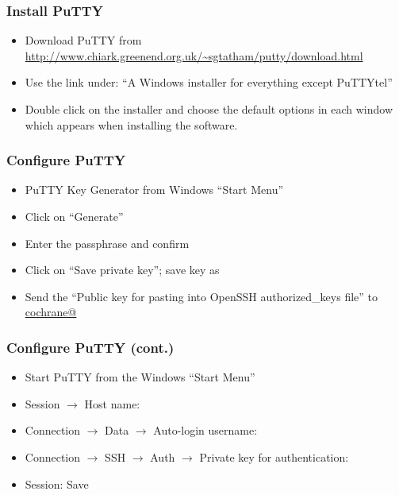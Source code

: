\begin{frame}
    \frametitle{Install PuTTY}
    \windowsframe

    \begin{itemize}
        \item Download PuTTY from
            \url{http://www.chiark.greenend.org.uk/~sgtatham/putty/download.html}
        \item Use the link under:
            \enquote{A Windows installer for everything except PuTTYtel}
        \item Double click on the installer and choose the default options
            in each window which appears when installing the software.
    \end{itemize}
\end{frame}

\begin{frame}[fragile]
    \frametitle{Configure PuTTY}
    \windowsframe

    \begin{itemize}
        \item PuTTY Key Generator from Windows \enquote{Start Menu}
        \item Click on \enquote{Generate}
        \item Enter the passphrase and confirm
        \item Click on \enquote{Save private key}; save key as 
        \item Send the \enquote{Public key for pasting into OpenSSH
            authorized\_keys file} to \url{cochrane@}
    \end{itemize}
\end{frame}

\begin{frame}[fragile]
    \frametitle{Configure PuTTY (cont.)}
    \windowsframe

    \begin{itemize}
        \item Start PuTTY from the Windows \enquote{Start Menu}
        \item Session $\rightarrow$
            Host name: 
        \item Connection $\rightarrow$ Data $\rightarrow$ Auto-login
            username: 
        \item Connection $\rightarrow$ SSH $\rightarrow$ Auth $\rightarrow$
            Private key for authentication: 
        \item Session: Save
    \end{itemize}
\end{frame}


